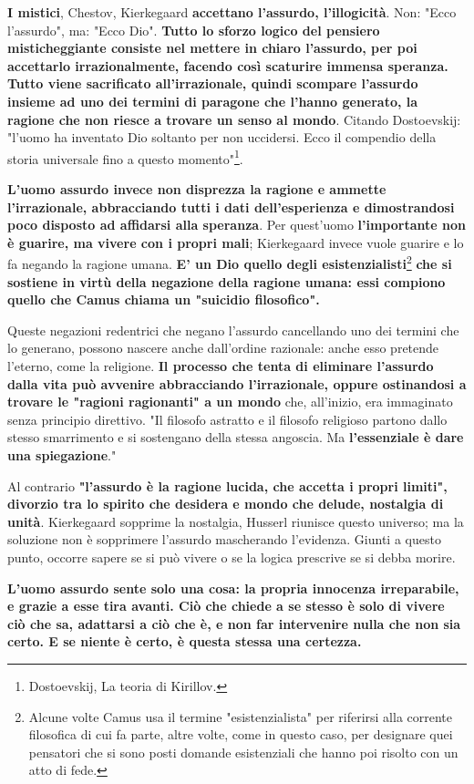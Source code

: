 \documentclass[a4paper,12pt,oneside]{article}%
\begin{document}
\textbf{I mistici}, Chestov, Kierkegaard \textbf{accettano l'assurdo, l'illogicità}. Non: "Ecco l'assurdo", ma: "Ecco Dio". \textbf{Tutto lo sforzo logico del pensiero misticheggiante consiste nel mettere in chiaro l'assurdo, per poi accettarlo irrazionalmente, facendo così scaturire immensa speranza. Tutto viene sacrificato all'irrazionale, quindi scompare l'assurdo insieme ad uno dei termini di paragone che l'hanno generato, la ragione che non riesce a trovare un senso al mondo}. Citando Dostoevskij: "l'uomo ha inventato Dio soltanto per non uccidersi. Ecco il compendio della storia universale fino a questo momento"\footnote{Dostoevskij, La teoria di Kirillov.}.

\textbf{L'uomo assurdo invece non disprezza la ragione e ammette l'irrazionale, abbracciando tutti i dati dell'esperienza e dimostrandosi poco disposto ad affidarsi alla speranza}. Per quest'uomo \textbf{l'importante non è guarire, ma vivere con i propri mali}; Kierkegaard invece vuole guarire e lo fa negando la ragione umana. \textbf{E' un Dio quello degli esistenzialisti}\footnote{Alcune volte Camus usa il termine "esistenzialista" per riferirsi alla corrente filosofica di cui fa parte, altre volte, come in questo caso, per designare quei pensatori che si sono posti domande esistenziali che hanno poi risolto con un atto di fede.} \textbf{che si sostiene in virtù della negazione della ragione umana: essi compiono quello che Camus chiama un "suicidio filosofico".}

Queste negazioni redentrici che negano l'assurdo cancellando uno dei termini che lo generano, possono nascere anche dall'ordine razionale: anche esso pretende l'eterno, come la religione. \textbf{Il processo che tenta di eliminare l'assurdo dalla vita può avvenire abbracciando l'irrazionale, oppure ostinandosi a trovare le "ragioni ragionanti" a un mondo} che, all'inizio, era immaginato senza principio direttivo. "Il filosofo astratto e il filosofo religioso partono dallo stesso smarrimento e si sostengano della stessa angoscia. Ma \textbf{l'essenziale è dare una spiegazione}."

Al contrario \textbf{"l'assurdo è la ragione lucida, che accetta i propri limiti", divorzio tra lo spirito che desidera e mondo che delude, nostalgia di unità}. Kierkegaard sopprime la nostalgia, Husserl riunisce questo universo; ma la soluzione non è sopprimere l'assurdo mascherando l'evidenza. Giunti a questo punto, occorre sapere se si può vivere o se la logica prescrive se si debba morire.

\textbf{L'uomo assurdo sente solo una cosa: la propria innocenza irreparabile, e grazie a esse tira avanti. Ciò che chiede a se stesso è solo di vivere ciò che sa, adattarsi a ciò che è, e non far intervenire nulla che non sia certo. E se niente è certo, è questa stessa una certezza.}
\end{document}

